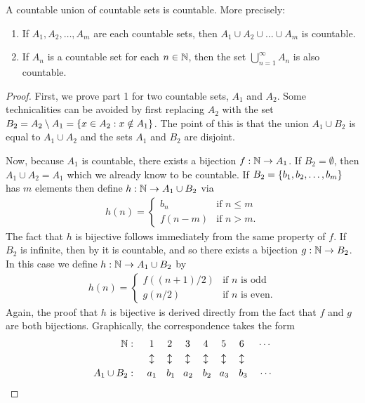 \documentclass[11pt,twoside=off,numbers=noenddot]{scrbook}
\begin{document}
\begin{theorem}
    A countable union of countable sets is countable. More precisely:
    \begin{enumerate}
        \item If $A_1, A_2, \dots, A_m$ are each countable sets, then $A_1 \cup A_2 \cup \dots \cup A_m$ is countable.
        \item If $A_n$ is a countable set for each $n \in \mathbb N$, then the set $\bigcup_{n = 1}^{\infty} A_n$ is also countable.
    \end{enumerate}
\end{theorem}

\begin{proof}
    First, we prove part 1 for two countable sets, $A_1$ and $A_2$. Some technicalities can be avoided by first replacing $A_2$ with the set $B_2 = A_2 \setminus A_1 = \{ x \in A_2 : x \notin A_1 \}$. The point of this is that the union $A_1 \cup B_2$ is equal to $A_1 \cup A_2$ and the sets $A_1$ and $B_2$ are disjoint.

    Now, because $A_1$ is countable, there exists a bijection $f : \mathbb N \to A_1$. If $B_2 = \emptyset$, then $A_1 \cup A_2 = A_1$ which we already know to be countable. If $B_2 = \{ b_1, b_2, \dots, b_m \}$ has $m$ elements then define $h : \mathbb N \to A_1 \cup B_2$ via
    \begin{align*}
        h(n) = \begin{cases}
            b_n & \text{if $n \leq m$} \\
            f(n - m) & \text{if $n > m$}.
        \end{cases}
    \end{align*}
    The fact that $h$ is bijective follows immediately from the same property of $f$. If $B_2$ is infinite, then by  it is countable, and so there exists a bijection $g : \mathbb N \to B_2$. In this case we define $h : \mathbb N \to A_1 \cup B_2$ by
    \begin{align*}
        h(n) = \begin{cases}
            f((n + 1) / 2) & \text{if $n$ is odd} \\
            g(n / 2) & \text{if $n$ is even}.
        \end{cases}
    \end{align*}
    Again, the proof that $h$ is bijective is derived directly from the fact that $f$ and $g$ are both bijections. Graphically, the correspondence takes the form
    \begin{align*}
        \mathbb N : \quad & \:\:\, 1 \quad\,\, 2 \quad\,\, 3 \quad\,\, 4 \quad\,\, 5 \quad\,\, 6 \quad\,\, \cdots \\
        & \,\, \updownarrow \quad\,\, \updownarrow \quad\,\, \updownarrow \quad\,\, \updownarrow \quad\,\, \updownarrow \quad\,\, \updownarrow \\
        A_1 \cup B_2 : \quad & \:\, a_1 \quad b_1 \,\,\,\,\, a_2 \quad b_2 \,\,\,\,\, a_3 \quad b_3 \:\:\,\,\,\, \cdots
    \end{align*}


\end{proof}
\end{document}
